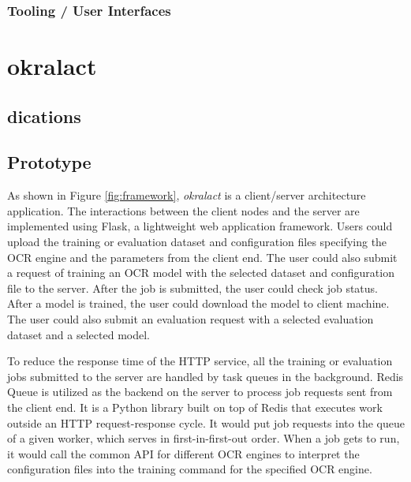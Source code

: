 \documentclass[conference]{IEEEtran}
\begin{document}
\subsubsection*{Tooling / User Interfaces}


\section*{okralact}

\subsection*{dications}


\subsection*{Prototype}     

As shown in Figure \ref{fig:framework}, \textit{okralact} is a client/server    
architecture application. The interactions between the client nodes and the     
server are implemented using Flask, a lightweight web application framework. Users could upload the training or evaluation 
dataset and configuration files specifying the OCR engine and the parameters    
from the client end. The user could also submit a request of training an OCR    
model with the selected dataset and configuration file to the server. After the 
job is submitted, the user could check job status. After a model is trained,    
the user could download the model to client machine. The user could also submit 
an evaluation request with a selected evaluation dataset and a selected model.

To reduce the response time of the HTTP service, all the training or evaluation jobs submitted to the server are handled by task queues in the background. Redis Queue is 
utilized as the backend on the server to process job requests sent from the     
client end. It is a Python library built on top of Redis that executes work  
outside an HTTP request-response cycle.  It would put job requests into the      
queue of a given worker, which serves in first-in-first-out order. When a job   
gets to run, it would call the common API for different OCR engines to
interpret the configuration files into the training command for the specified
OCR engine.
\end{document}
